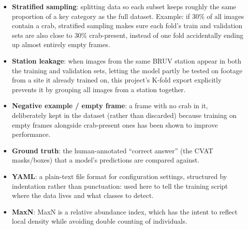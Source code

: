 \documentclass[
]{book}
\begin{document}
\begin{itemize}
\item
  \textbf{Stratified sampling}: splitting data so each subset keeps roughly the same proportion of a key category as the full dataset. Example: if 30\% of all images contain a crab, stratified sampling makes sure each fold's train and validation sets are also close to 30\% crab-present, instead of one fold accidentally ending up almost entirely empty frames.
\item
  \textbf{Station leakage}: when images from the same BRUV station appear in both the training and validation sets, letting the model partly be tested on footage from a site it already trained on, this project's K-fold export explicitly prevents it by grouping all images from a station together.
\item
  \textbf{Negative example / empty frame}: a frame with no crab in it, deliberately kept in the dataset (rather than discarded) because training on empty frames alongside crab-present ones has been shown to improve performance.
\item
  \textbf{Ground truth}: the human-annotated ``correct answer'' (the CVAT masks/boxes) that a model's predictions are compared against.
\item
  \textbf{YAML}: a plain-text file format for configuration settings, structured by indentation rather than punctuation: used here to tell the training script where the data lives and what classes to detect.
\item
  \textbf{MaxN}: MaxN is
  a relative abundance index, which has the intent to reflect local
  density while avoiding double counting of individuals.
\end{itemize}


\end{document}
